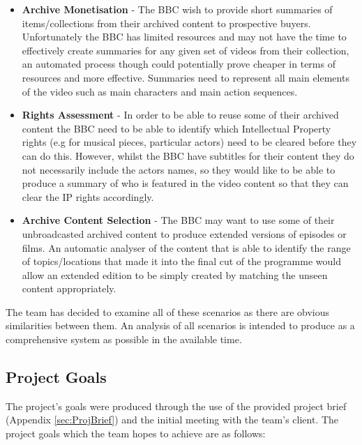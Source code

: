 \begin{itemize}
	\item{\textbf{Archive Monetisation} - The BBC wish to provide short summaries of items/collections from their archived content to prospective buyers. Unfortunately the BBC has limited resources and may not have the time to effectively create summaries for any given set of videos from their collection, an automated process though could potentially prove cheaper in terms of resources and more effective. Summaries need to represent all main elements of the video such as main characters and main action sequences.}
	\item{\textbf{Rights Assessment} - In order to be able to reuse some of their archived content the BBC need to be able to identify which Intellectual Property rights (e.g for musical pieces, particular actors) need to be cleared before they can do this. However, whilst the BBC have subtitles for their content they do not necessarily include the actors names, so they would like to be able to produce a summary of who is featured in the video content so that they can clear the IP rights accordingly.}
	\item{\textbf{Archive Content Selection} - The BBC may want to use some of their unbroadcasted archived content to produce extended versions of episodes or films. An automatic analyser of the content that is able to identify the range of topics/locations that made it into the final cut of the programme would allow an extended edition to be simply created by matching the unseen content appropriately.}
\end{itemize}

The team has decided to examine all of these scenarios as there are obvious similarities between them. An analysis of all scenarios is intended to produce as a comprehensive system as possible in the available time.

\subsection{Project Goals}
\label{sec:projectGoals}
The project’s goals were produced through the use of the provided project brief (Appendix \ref{sec:ProjBrief}) and the initial meeting with the team's client. The project goals which the team hopes to achieve are as follows:

